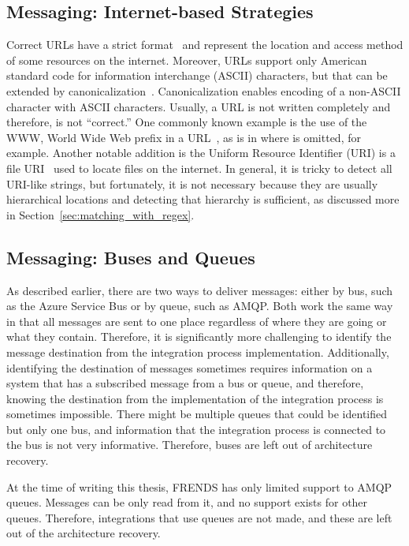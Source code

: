 \documentclass[english, 12pt, a4paper, sci, utf8, a-2b, online, obeyspaces]{aaltothesis}
\begin{document}
\subsection{Messaging: Internet-based Strategies}

Correct URLs have a strict format~\cite{hoffman2005telnet} and represent the location and access method of some resources on the internet. Moreover, URLs support only American standard code for information interchange (ASCII) characters, but that can be extended by canonicalization~\cite{microsoft2018handling}. Canonicalization enables encoding of a non-ASCII character with ASCII characters. Usually, a URL is not written completely and therefore, is not “correct.” One commonly known example is the use of the WWW, World Wide Web prefix in a URL~\cite{bernerslee1994uniform}, as is in  where  is omitted, for example. Another notable addition is the Uniform Resource Identifier (URI) is a file URI~\cite{kervin2017file} used to locate files on the internet. In general, it is tricky to detect all URI-like strings, but fortunately, it is not necessary because they are usually hierarchical locations and detecting that hierarchy is sufficient, as discussed more in Section~\ref{sec:matching_with_regex}.

\subsection{Messaging: Buses and Queues}
\label{sec:messaging_buses_and_queues}
As described earlier, there are two ways to deliver messages: either by bus, such as the Azure Service Bus or by queue, such as AMQP. Both work the same way in that all messages are sent to one place regardless of where they are going or what they contain. Therefore, it is significantly more challenging to identify the message destination from the integration process implementation. Additionally, identifying the destination of messages sometimes requires information on a system that has a subscribed message from a bus or queue, and therefore, knowing the destination from the implementation of the integration process is sometimes impossible. There might be multiple queues that could be identified but only one bus, and information that the integration process is connected to the bus is not very informative. Therefore, buses are left out of architecture recovery.

At the time of writing this thesis, FRENDS has only limited support to AMQP queues. Messages can be only read from it, and no support exists for other queues. Therefore, integrations that use queues are not made, and these are left out of the architecture recovery.
\end{document}
